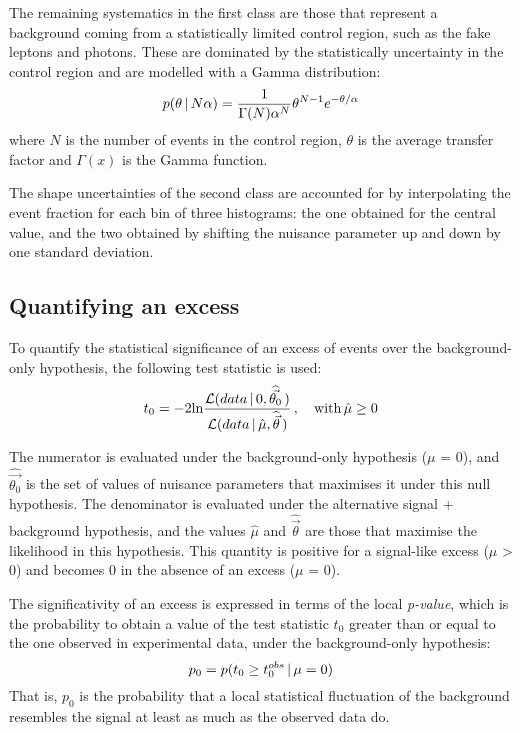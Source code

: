 The remaining systematics in the first class are those that represent a background coming from a statistically limited control region, such as the fake leptons and photons.
These are dominated by the statistically uncertainty in the control region and are modelled with a Gamma distribution:
\begin{equation}
  \label{eq:gammadef}
  p(\theta\,|\,N\alpha) = \frac{1}{\Gamma(N) \alpha^N} \theta^{N-1} e^{-\theta/\alpha}
\end{equation}
where $N$ is the number of events in the control region, $\theta$ is the average transfer factor and $\Gamma(x)$ is the Gamma function.

The shape uncertainties of the second class are accounted for by interpolating the event fraction for each bin of three histograms: the one obtained for the central value, and the two obtained by shifting the nuisance parameter up and down by one standard deviation.

\subsection{Quantifying an excess}
To quantify the statistical significance of an excess of events over the background-only hypothesis, the following test statistic is used:
\begin{equation}
  \label{eq:test_statistic}
  t_0 = -2\text{ln} \frac {\mathcal{L}(data\,|\,0,\widehat{\vec{\theta_0}}\,)} {\mathcal{L}(data\,|\,\hat\mu,\widehat{\vec\theta}\,)}\,,\quad \text{with}\, \hat\mu \ge 0
\end{equation}

The numerator is evaluated under the background-only hypothesis ($\mu$ = 0), and $\widehat{\vec{\theta_0}}$ is the set of values of nuisance parameters that maximises it under this null hypothesis.
The denominator is evaluated under the alternative signal + background hypothesis, and the values $\hat{\mu}$ and $\hat{\vec{\theta}}$ are those that maximise the likelihood in this hypothesis.
This quantity is positive for a signal-like excess ($\mu$ > 0) and becomes 0 in the absence of an excess ($\mu$ = 0).

The significativity of an excess is expressed in terms of the local \textit{p-value}, which is the probability to obtain a value of the test statistic $t_0$ greater than or equal to the one observed in experimental data, under the background-only hypothesis:
\begin{equation}
  \label{eq:pvalue}
  p_0 = p(t_0 \ge t_0^{obs}\, |\, \mu = 0)
\end{equation}
That is, $p_0$ is the probability that a local statistical fluctuation of the background resembles the signal at least as much as the observed data do.


